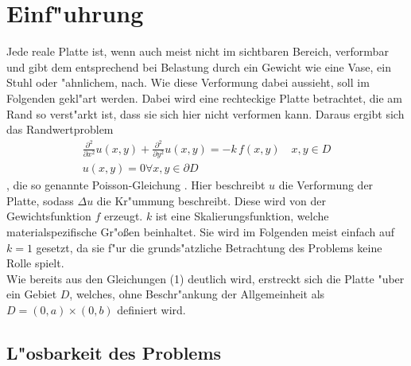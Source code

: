 \section{Einf"uhrung}
Jede reale Platte ist, wenn auch meist nicht im sichtbaren Bereich, verformbar und gibt dem entsprechend bei Belastung durch ein Gewicht wie eine Vase, ein Stuhl oder "ahnlichem, nach. Wie diese Verformung dabei aussieht, soll im Folgenden gekl"art werden. Dabei wird eine rechteckige Platte betrachtet, die am Rand so verst"arkt ist, dass sie sich hier nicht verformen kann. Daraus ergibt sich das Randwertproblem
\begin{align}\frac{\partial ^2}{\partial x^2}u(x,y)+\frac{\partial ^2}{\partial y^2}u(x,y)=-k\,f(x,y) \quad x,y \in D \\
u(x,y)=0 \forall x,y \in \partial D \end{align}
, die so genannte \glqq Poisson-Gleichung \grqq. Hier beschreibt $u$ die Verformung der Platte, sodass $\Delta u$ die Kr"ummung %
beschreibt. Diese wird von der Gewichtsfunktion $f$ erzeugt. $k$ ist eine Skalierungsfunktion, welche materialspezifische Gr"oßen beinhaltet. Sie wird im Folgenden meist einfach auf $k=1$ gesetzt, da sie f"ur die grunds"atzliche Betrachtung des Problems keine Rolle spielt.\\
Wie bereits aus den Gleichungen (1) deutlich wird, erstreckt sich die Platte "uber ein Gebiet $D$, welches, ohne Beschr"ankung der Allgemeinheit als $D=(0,a)\times (0,b)$  definiert wird.
\subsection{L"osbarkeit des Problems}

